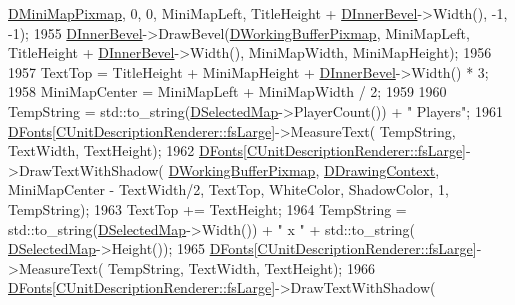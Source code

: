 \begin{DoxyCode}
      \hyperlink{classCApplicationData_abe3af81659ead5113b7b2f165a88e737}{DMiniMapPixmap}, 0, 0, MiniMapLeft, TitleHeight + \hyperlink{classCApplicationData_a29a687c44dceb9e87a56d96612d59ab5}{DInnerBevel}->Width(), -1, -1);
1955     \hyperlink{classCApplicationData_a29a687c44dceb9e87a56d96612d59ab5}{DInnerBevel}->DrawBevel(\hyperlink{classCApplicationData_afa34cf2780f38dd28c0c811e69d60a97}{DWorkingBufferPixmap}, MiniMapLeft, TitleHeight + 
      \hyperlink{classCApplicationData_a29a687c44dceb9e87a56d96612d59ab5}{DInnerBevel}->Width(), MiniMapWidth, MiniMapHeight);
1956     
1957     TextTop = TitleHeight + MiniMapHeight + \hyperlink{classCApplicationData_a29a687c44dceb9e87a56d96612d59ab5}{DInnerBevel}->Width() * 3;
1958     MiniMapCenter = MiniMapLeft + MiniMapWidth / 2;
1959     
1960     TempString = std::to\_string(\hyperlink{classCApplicationData_abf74a18394e479b7090a8f9a55608867}{DSelectedMap}->PlayerCount()) + \textcolor{stringliteral}{" Players"};
1961     \hyperlink{classCApplicationData_afde9247d0a3ea87393ec86dcdb1e8274}{DFonts}[\hyperlink{classCUnitDescriptionRenderer_a3ea4cd83b6dd9533ab3abb953a7da35aaf467097fe4f4811a5e2f1959c86e071d}{CUnitDescriptionRenderer::fsLarge}]->MeasureText(
      TempString, TextWidth, TextHeight);
1962     \hyperlink{classCApplicationData_afde9247d0a3ea87393ec86dcdb1e8274}{DFonts}[\hyperlink{classCUnitDescriptionRenderer_a3ea4cd83b6dd9533ab3abb953a7da35aaf467097fe4f4811a5e2f1959c86e071d}{CUnitDescriptionRenderer::fsLarge}]->DrawTextWithShadow(
      \hyperlink{classCApplicationData_afa34cf2780f38dd28c0c811e69d60a97}{DWorkingBufferPixmap}, \hyperlink{classCApplicationData_aa6c5bea9bdcc64398e5a3f693661d37c}{DDrawingContext}, MiniMapCenter - TextWidth/2, 
      TextTop, WhiteColor, ShadowColor, 1, TempString);
1963     TextTop += TextHeight;
1964     TempString = std::to\_string(\hyperlink{classCApplicationData_abf74a18394e479b7090a8f9a55608867}{DSelectedMap}->Width()) + \textcolor{stringliteral}{" x "} + std::to\_string(
      \hyperlink{classCApplicationData_abf74a18394e479b7090a8f9a55608867}{DSelectedMap}->Height());
1965     \hyperlink{classCApplicationData_afde9247d0a3ea87393ec86dcdb1e8274}{DFonts}[\hyperlink{classCUnitDescriptionRenderer_a3ea4cd83b6dd9533ab3abb953a7da35aaf467097fe4f4811a5e2f1959c86e071d}{CUnitDescriptionRenderer::fsLarge}]->MeasureText(
      TempString, TextWidth, TextHeight);
1966     \hyperlink{classCApplicationData_afde9247d0a3ea87393ec86dcdb1e8274}{DFonts}[\hyperlink{classCUnitDescriptionRenderer_a3ea4cd83b6dd9533ab3abb953a7da35aaf467097fe4f4811a5e2f1959c86e071d}{CUnitDescriptionRenderer::fsLarge}]->DrawTextWithShadow(

\end{DoxyCode}
